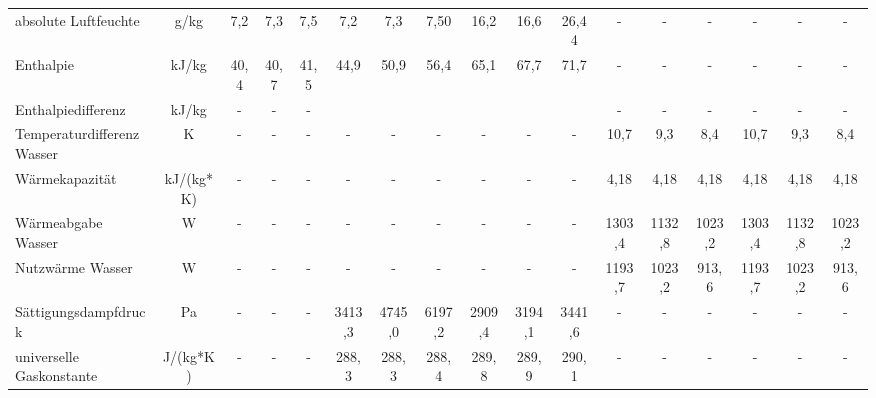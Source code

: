\begin{table}[h!]
{\begin{tabular}{l|c|c|c|c|c|c|c|c|c|c|c|c|c|c|c|c}
			absolute Luftfeuchte & g/kg  & \multicolumn{1}{c|}{7,2} & \multicolumn{1}{c|}{7,3} & \multicolumn{1}{c|}{7,5} & 7,2   & 7,3   & 7,50  & 16,2  & 16,6  & 26,44 & -     & -     & -     & -     & -     & - \\
			Enthalpie & kJ/kg & \multicolumn{1}{c|}{40,4} & \multicolumn{1}{c|}{40,7} & \multicolumn{1}{c|}{41,5} & 44,9  & 50,9  & 56,4  & 65,1  & 67,7  & 71,7  & -     & -     & -     & -     & -     & - \\
			Enthalpiedifferenz & kJ/kg & -     & -     & -     & \multicolumn{4}{c|}{}          &       &       & -     & -     & -     & -     & -     & - \\
			\hline
			Temperaturdifferenz  Wasser & K     & -     & -     & -     & \multicolumn{1}{c|}{-} & \multicolumn{1}{c|}{-} & \multicolumn{1}{c|}{-} & \multicolumn{1}{c|}{-} & \multicolumn{1}{c|}{-} & \multicolumn{1}{c|}{-} & \multicolumn{1}{c|}{10,7} & \multicolumn{1}{c|}{9,3} & \multicolumn{1}{c|}{8,4} & \multicolumn{1}{c|}{10,7} & 9,3   & 8,4 \\
			Wärmekapazität & kJ/(kg*K) & -     & -     & -     & \multicolumn{1}{c|}{-} & \multicolumn{1}{c|}{-} & \multicolumn{1}{c|}{-} & \multicolumn{1}{c|}{-} & \multicolumn{1}{c|}{-} & \multicolumn{1}{c|}{-} & \multicolumn{1}{c|}{4,18} & \multicolumn{1}{c|}{4,18} & \multicolumn{1}{c|}{4,18} & \multicolumn{1}{c|}{4,18} & 4,18  & 4,18 \\
			Wärmeabgabe Wasser & W     & -     & -     & -     & \multicolumn{1}{c|}{-} & \multicolumn{1}{c|}{-} & \multicolumn{1}{c|}{-} & \multicolumn{1}{c|}{-} & \multicolumn{1}{c|}{-} & \multicolumn{1}{c|}{-} & \multicolumn{1}{c|}{1303,4} & \multicolumn{1}{c|}{1132,8} & \multicolumn{1}{c|}{1023,2} & \multicolumn{1}{c|}{1303,4} & 1132,8 & 1023,2 \\
			Nutzwärme Wasser & W     & -     & -     & -     & \multicolumn{1}{c|}{-} & \multicolumn{1}{c|}{-} & \multicolumn{1}{c|}{-} & \multicolumn{1}{c|}{-} & \multicolumn{1}{c|}{-} & \multicolumn{1}{c|}{-} & \multicolumn{1}{c|}{1193,7} & \multicolumn{1}{c|}{1023,2} & \multicolumn{1}{c|}{913,6} & \multicolumn{1}{c|}{1193,7} & 1023,2 & 913,6 \\
			\hline
			Sättigungsdampfdruck & Pa    & -     & -     & -     & 3413,3 & 4745,0 & 6197,2 & 2909,4 & 3194,1 & 3441,6 & -     & -     & -     & -     & -     & - \\
			universelle Gaskonstante & J/(kg*K) & -     & -     & -     & 288,3 & 288,3 & 288,4 & 289,8 & 289,9 & 290,1 & -     & -     & -     & -     & -     & - \\

\end{tabular}}
\end{table}
